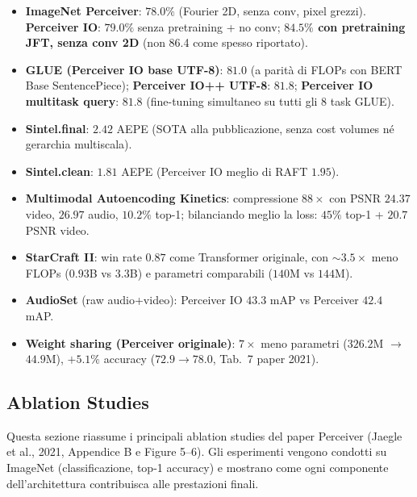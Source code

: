 \documentclass[
  11pt,
]{article}
\begin{document}
\begin{formulabox}[title={\textbf{Numeri chiave da memorizzare}}]
\begin{itemize}
  \item \textbf{ImageNet Perceiver}: $78.0\%$ (Fourier 2D, senza conv, pixel grezzi). \textbf{Perceiver IO}: $79.0\%$ senza pretraining + no conv; \textbf{$84.5\%$ con pretraining JFT, senza conv 2D} (non 86.4 come spesso riportato).
  \item \textbf{GLUE (Perceiver IO base UTF-8)}: $81.0$ (a parità di FLOPs con BERT Base SentencePiece); \textbf{Perceiver IO++ UTF-8}: $81.8$; \textbf{Perceiver IO multitask query}: $81.8$ (fine-tuning simultaneo su tutti gli 8 task GLUE).
  \item \textbf{Sintel.final}: $2.42$ AEPE (SOTA alla pubblicazione, senza cost volumes né gerarchia multiscala).
  \item \textbf{Sintel.clean}: $1.81$ AEPE (Perceiver IO meglio di RAFT $1.95$).
  \item \textbf{Multimodal Autoencoding Kinetics}: compressione $88\times$ con PSNR $24.37$ video, $26.97$ audio, $10.2\%$ top-1; bilanciando meglio la loss: $45\%$ top-1 + $20.7$ PSNR video.
  \item \textbf{StarCraft II}: win rate $0.87$ come Transformer originale, con $\sim 3.5\times$ meno FLOPs ($0.93$B vs $3.3$B) e parametri comparabili ($140$M vs $144$M).
  \item \textbf{AudioSet} (raw audio+video): Perceiver IO $43.3$ mAP vs Perceiver $42.4$ mAP.
  \item \textbf{Weight sharing (Perceiver originale)}: $7\times$ meno parametri ($326.2$M $\to$ $44.9$M), $+5.1\%$ accuracy ($72.9 \to 78.0$, Tab.\ 7 paper 2021).
\end{itemize}
\end{formulabox}

\subsection{Ablation Studies}
\label{sec:ablations}

Questa sezione riassume i principali ablation studies del paper Perceiver (Jaegle et al., 2021, Appendice B e Figure 5--6). Gli esperimenti vengono condotti su ImageNet (classificazione, top-1 accuracy) e mostrano come ogni componente dell'architettura contribuisca alle prestazioni finali.
\end{document}
